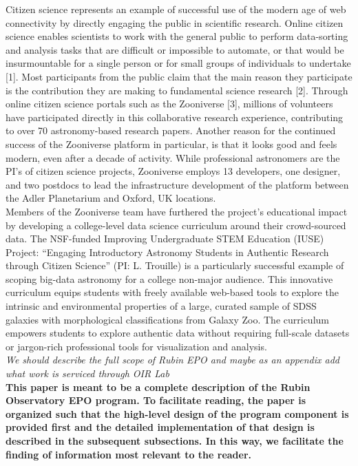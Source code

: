 Citizen science represents an example of successful use of the modern age of web connectivity by directly engaging the public in scientific research. Online citizen science enables scientists to work with the general public to perform data-sorting and analysis tasks that are difficult or impossible to automate, or that would be insurmountable for a single person or for small groups of individuals to undertake [1]. Most participants from the public claim that the main reason they participate is the contribution they are making to fundamental science research [2]. Through online citizen science portals such as the Zooniverse [3], millions of volunteers have participated directly in this collaborative research experience, contributing to over 70 astronomy-based research papers. Another reason for the continued success of the Zooniverse platform in particular, is that it looks good and feels modern, even after a decade of activity. While professional astronomers are the PI's of citizen science projects, Zooniverse employs 13 developers, one designer, and two postdocs to lead the infrastructure development of the platform between the Adler Planetarium and Oxford, UK locations.\\

Members of the Zooniverse team have furthered the project's educational impact by developing a college-level data science curriculum around their crowd-sourced data. The NSF-funded Improving Undergraduate STEM Education (IUSE) Project: “Engaging Introductory Astronomy Students in Authentic Research through Citizen Science” (PI: L. Trouille) is a particularly successful example of scoping big-data astronomy for a college non-major audience. This innovative curriculum equips students with freely available web-based tools to explore the intrinsic and environmental properties of a large, curated sample of  SDSS galaxies with morphological classifications from Galaxy Zoo.  The curriculum empowers students to explore authentic data without requiring full-scale datasets or jargon-rich professional tools for visualization and analysis. \\

{\it We should describe the full scope of Rubin EPO and maybe as an appendix add what work is serviced through OIR Lab} \\

\textbf{This paper is meant to be a complete description of the Rubin Observatory EPO program. To facilitate reading, the paper is organized such that the high-level design of the program component is provided first and the detailed implementation of that design is described in the subsequent subsections.  In this way, we facilitate the finding of information most relevant to the reader.}

